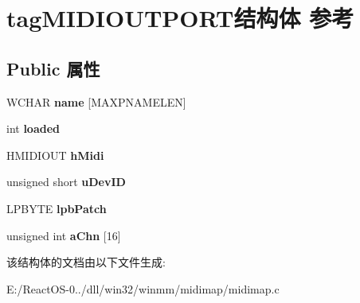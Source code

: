 \hypertarget{structtag_m_i_d_i_o_u_t_p_o_r_t}{}\section{tag\+M\+I\+D\+I\+O\+U\+T\+P\+O\+R\+T结构体 参考}
\label{structtag_m_i_d_i_o_u_t_p_o_r_t}
\subsection*{Public 属性}
\begin{DoxyCompactItemize}
\item 
\mbox{\label{structtag_m_i_d_i_o_u_t_p_o_r_t_af75ec96b6060c9e8b575ec3a55cf5a39}} 
W\+C\+H\+AR {\bfseries name} \mbox{[}M\+A\+X\+P\+N\+A\+M\+E\+L\+EN\mbox{]}
\item 
\mbox{\label{structtag_m_i_d_i_o_u_t_p_o_r_t_ad5998b99e0a6152aec003668e70e9463}} 
int {\bfseries loaded}
\item 
\mbox{\label{structtag_m_i_d_i_o_u_t_p_o_r_t_a4cae3b3d3b971ed09daff8e502492204}} 
H\+M\+I\+D\+I\+O\+UT {\bfseries h\+Midi}
\item 
\mbox{\label{structtag_m_i_d_i_o_u_t_p_o_r_t_a5abcc744ff8c97eb8f46123d3788671b}} 
unsigned short {\bfseries u\+Dev\+ID}
\item 
\mbox{\label{structtag_m_i_d_i_o_u_t_p_o_r_t_a742970c04cb94655c7dece75a95942c7}} 
L\+P\+B\+Y\+TE {\bfseries lpb\+Patch}
\item 
\mbox{\label{structtag_m_i_d_i_o_u_t_p_o_r_t_a71cf9de766ddcabd2067727841066f4b}} 
unsigned int {\bfseries a\+Chn} \mbox{[}16\mbox{]}
\end{DoxyCompactItemize}


该结构体的文档由以下文件生成\+:\begin{DoxyCompactItemize}
\item 
E\+:/\+React\+O\+S-\/0../dll/win32/winmm/midimap/midimap.\+c\end{DoxyCompactItemize}
